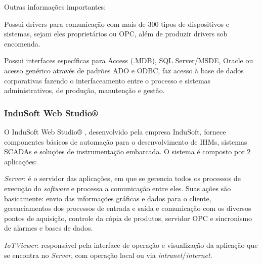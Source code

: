     
    Outras informações importantes:
    
    \begin{alineascomponto}
    	\item Possui drivers para comunicação com mais de 300 tipos de dispositivos e sistemas, sejam eles proprietários ou \gls{OPC}, além de produzir drivers sob encomenda.
    	\item Possui interfaces específicas para Access (.MDB), SQL Server/MSDE, Oracle ou acesso genérico através de padrões ADO e ODBC, faz acesso à base de dados corporativas fazendo o interfaceamento entre o processo e sistemas administrativos, de produção, manutenção e gestão.
    \end{alineascomponto}
    
\subsubsection{InduSoft Web Studio®}
\label{sec:indusoft}

    O InduSoft Web Studio® \cite{InduSoft}, desenvolvido pela empresa InduSoft, fornece componentes básicos de automação para o desenvolvimento de \glspl{IHM}, sistemas \glspl{SCADA} e soluções de instrumentação embarcada. O sistema é composto por 2 aplicações:
    
    \begin{alineascomponto}
        \item \textit{Server}: é o servidor das aplicações, em que se gerencia todos os processos de execução do \textit{software} e processa a comunicação entre eles. Suas ações são basicamente: envio das informações gráficas e dados para o cliente, gerenciamentos dos processos de entrada e saída e comunicação com os diversos pontos de aquisição, controle da cópia de produtos, servidor OPC e sincronismo de alarmes e bases de dados.
    	\item \textit{IoTViewer}: responsável pela interface de operação e visualização da aplicação que se encontra no \textit{Server}, com operação local ou via \textit{intranet}/\textit{internet}.
    \end{alineascomponto}

